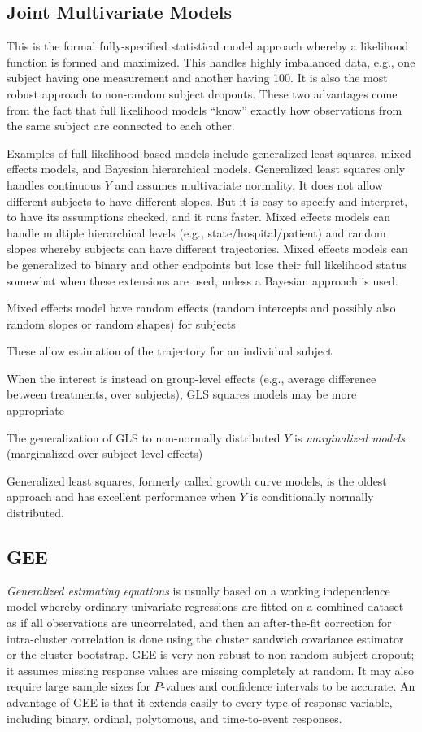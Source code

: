 \subsection{Joint Multivariate Models}\ipacue
This is the formal fully-specified statistical model approach whereby
a likelihood function is formed and maximized.  This handles highly
imbalanced data, e.g., one subject having one measurement and another
having 100.  It is also the most robust approach to non-random subject
dropouts.  These two advantages come from the fact that full
likelihood models ``know'' exactly how observations from the same
subject are connected to each other.

Examples of full likelihood-based models include
generalized least squares, mixed effects models, and Bayesian hierarchical
models.  Generalized least
squares only handles continuous $Y$ and assumes multivariate
normality.  It does not allow different subjects to have different
slopes.  But it is easy to specify and interpret, to have its assumptions
checked, and it runs faster.
Mixed effects models can handle multiple hierarchical levels (e.g.,
state/hospital/patient) and random slopes whereby subjects can
have different trajectories.  Mixed effects models can be generalized
to binary and other endpoints but lose their full likelihood status
somewhat when these extensions are used, unless a Bayesian approach is used.

\bi
\item Mixed effects model have random effects (random intercepts and possibly also random slopes or random shapes) for subjects
\item These allow estimation of the trajectory for an individual subject
\item When the interest is instead on group-level effects (e.g., average difference between treatments, over subjects), GLS squares models may be more appropriate
\item The generalization of GLS to non-normally distributed $Y$ is \emph{marginalized models} (marginalized over subject-level effects)
\ei

Generalized least squares, formerly called growth curve models, is the
oldest approach and has excellent performance when $Y$ is
conditionally normally distributed.

\subsection{GEE}\ipacue
\emph{Generalized estimating equations} is usually based on a working
independence model whereby ordinary univariate regressions are fitted on a
combined dataset as if all observations are uncorrelated, and then an
after-the-fit correction for intra-cluster
correlation is done using the cluster sandwich covariance estimator or the
cluster bootstrap.  GEE is very non-robust to non-random subject dropout; it
assumes missing response values are missing completely at random.  It
may also require large sample sizes for
$P$-values and confidence intervals to be accurate.  An advantage of GEE is
that it extends easily to every type of response variable, including binary,
ordinal, polytomous, and time-to-event responses.

